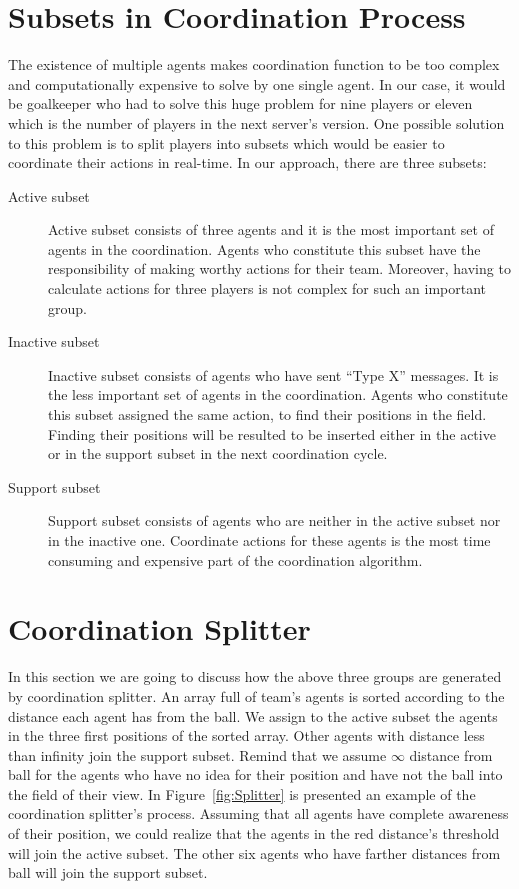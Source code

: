 \section{Subsets in Coordination Process}
The existence of multiple agents makes coordination function to be too complex and computationally expensive to solve by one single agent. In our case, it would be goalkeeper who had to solve this huge problem for nine players or eleven which is the number of players in the next server's version. 
One possible solution to this problem is to split players into subsets which would be easier to coordinate their actions in real-time. In our approach, there are three subsets:

\begin{description}
\item[Active subset] Active subset consists of three agents and it is the most important set of agents in the coordination. Agents who constitute this subset have the responsibility of making worthy actions for their team. Moreover, having to calculate actions for three players is not complex for such an important group. 

\item[Inactive subset] Inactive subset consists of agents who have sent ``Type X'' messages. It is the less important set of agents in the coordination. Agents who constitute this subset assigned the same action, to find their positions in the field. Finding their positions will be resulted to be inserted either in the active or in the support subset in the next coordination cycle.

\item[Support subset] Support subset consists of agents who are neither in the active subset nor in the inactive one. Coordinate actions for these agents is the most time consuming and expensive part of the coordination algorithm.
\end{description}

\section{Coordination Splitter}
In this section we are going to discuss how the above three groups are generated by coordination splitter. An array full of team's agents is sorted according to the distance each agent has from the ball. We assign to the active subset the agents in the three first positions of the sorted array.
Other agents with distance less than infinity join the support subset.
Remind that we assume $\infty$ distance from ball for the agents who have no idea for their position and have not the ball into the field of their view.
In Figure~\ref{fig:Splitter} is presented an example of the coordination splitter's process. Assuming that all agents have complete awareness of their position, we could realize that the agents in the red distance's threshold will join the active subset. The other six agents who have farther distances from ball will join the support subset.


